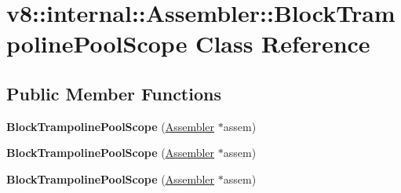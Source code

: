 \hypertarget{classv8_1_1internal_1_1_assembler_1_1_block_trampoline_pool_scope}{}\section{v8\+:\+:internal\+:\+:Assembler\+:\+:Block\+Trampoline\+Pool\+Scope Class Reference}
\label{classv8_1_1internal_1_1_assembler_1_1_block_trampoline_pool_scope}
\subsection*{Public Member Functions}
\begin{DoxyCompactItemize}
\item 
{\bfseries Block\+Trampoline\+Pool\+Scope} (\hyperlink{classv8_1_1internal_1_1_assembler}{Assembler} $\ast$assem)\hypertarget{classv8_1_1internal_1_1_assembler_1_1_block_trampoline_pool_scope_aa8cbe59b88737d851c985765fa49455f}{}\label{classv8_1_1internal_1_1_assembler_1_1_block_trampoline_pool_scope_aa8cbe59b88737d851c985765fa49455f}

\item 
{\bfseries Block\+Trampoline\+Pool\+Scope} (\hyperlink{classv8_1_1internal_1_1_assembler}{Assembler} $\ast$assem)\hypertarget{classv8_1_1internal_1_1_assembler_1_1_block_trampoline_pool_scope_aa8cbe59b88737d851c985765fa49455f}{}\label{classv8_1_1internal_1_1_assembler_1_1_block_trampoline_pool_scope_aa8cbe59b88737d851c985765fa49455f}

\item 
{\bfseries Block\+Trampoline\+Pool\+Scope} (\hyperlink{classv8_1_1internal_1_1_assembler}{Assembler} $\ast$assem)\hypertarget{classv8_1_1internal_1_1_assembler_1_1_block_trampoline_pool_scope_aa8cbe59b88737d851c985765fa49455f}{}\label{classv8_1_1internal_1_1_assembler_1_1_block_trampoline_pool_scope_aa8cbe59b88737d851c985765fa49455f}

\end{DoxyCompactItemize}
